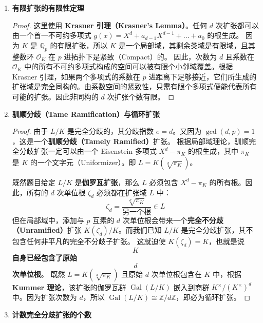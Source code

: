 \documentclass[]{article}
\begin{document}
	\begin{enumerate}[label=(\arabic*)]
		\item \textbf{有限扩张的有限性定理}
		
		\begin{proof}
			这里使用 \textbf{Krasner 引理（Krasner's Lemma）}。任何 $d$ 次扩张都可以由一个首一不可约多项式 $g(x) = X^d + a_{d-1}X^{d-1} + \dots + a_0$ 的根生成。
			因为 $K$ 是 $\mathbb{Q}_p$ 的有限扩张，所以 $K$ 是一个局部域，其剩余类域是有限域，且其整数环 $\mathcal{O}_K$ 在 $p$ 进拓扑下是紧致（Compact）的。
			因此，次数为 $d$ 且系数在 $\mathcal{O}_K$ 中的所有不可约多项式构成的空间可以被有限个小邻域覆盖。根据 Krasner 引理，如果两个多项式的系数在 $p$ 进距离下足够接近，它们所生成的扩张域是完全同构的。由系数空间的紧致性，只需有限个多项式便能代表所有可能的扩张。因此非同构的 $d$ 次扩张个数有限。
		\end{proof}
		
		\item \textbf{驯顺分歧（Tame Ramification）与循环扩张}
		
		\begin{proof}
			由于 $L/K$ 是完全分歧的，其分歧指数 $e = d$。又因为 $\gcd(d,p)=1$，这是一个\textbf{驯顺分歧（Tamely Ramified）}扩张。
			根据局部域理论，驯顺完全分歧扩张一定可以由一个 Eisenstein 多项式 $X^d - \pi_K$ 的根生成，其中 $\pi_K$ 是 $K$ 的一个文字元（Uniformizer）。即 $L = K(\sqrt[d]{\pi_K})$。
			
			既然题目给定 $L/K$ 是\textbf{伽罗瓦扩张}，那么 $L$ 必须包含 $X^d - \pi_K$ 的所有根。因此，所有的 $d$ 次单位根 $\zeta_d$ 必须都在扩张域 $L$ 中：
			\[ \zeta_d = \frac{\sqrt[d]{\pi_K}}{\text{另一个根}} \in L \]
			但在局部域中，添加与 $p$ 互素的 $d$ 次单位根会带来一个\textbf{完全不分歧（Unramified）}扩张 $K(\zeta_d)/K$。而我们已知 $L/K$ 是完全分歧扩张，其不包含任何非平凡的完全不分歧子扩张。
			这就迫使 $K(\zeta_d) = K$，也就是说 \textbf{$$K$$ 自身已经包含了原始 $$d$$ 次单位根}。
			既然 $L = K(\sqrt[d]{\pi_K})$ 且原始 $d$ 次单位根包含在 $K$ 中，根据 \textbf{Kummer 理论}，该扩张的伽罗瓦群 $\operatorname{Gal}(L/K)$ 嵌入到商群 $K^\times / (K^\times)^d$ 中。因为扩张次数为 $d$，所以 $\operatorname{Gal}(L/K) \cong \mathbb{Z}/d\mathbb{Z}$，即必为循环扩张。
		\end{proof}
		
		\item \textbf{计数完全分歧扩张的个数}
		

\end{enumerate}
\end{document}
